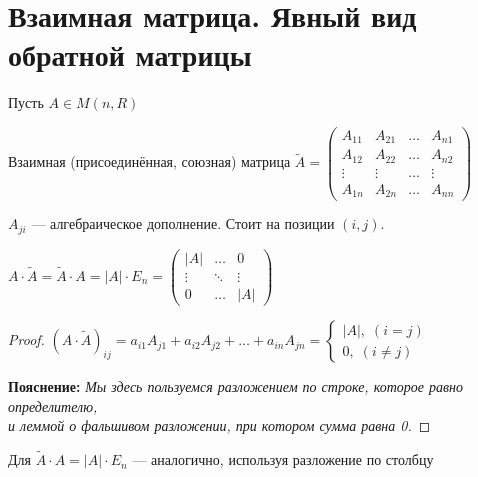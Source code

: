 
\section{Взаимная матрица. Явный вид обратной матрицы}

\begin{conj}
    
    Пусть $A \in M(n, R)$

    Взаимная (присоединённая, союзная) матрица $\widetilde{A} =
        \begin{pmatrix}
            A_{11} & A_{21} & \dots & A_{n1} \\
            A_{12} & A_{22} & \dots & A_{n2} \\
            \vdots & \vdots & \dots & \vdots \\
            A_{1n} & A_{2n} & \dots & A_{nn}
        \end{pmatrix}
    $

     \par
    
    $A_{ji}$ --- алгебраическое дополнение. Стоит на позиции $(i, j)$.
\end{conj}

\begin{theorem-non}
    
    $A \cdot \widetilde{A} = \widetilde{A} \cdot A = |A| \cdot E_n =
        \begin{pmatrix}
            |A| & \dots & 0 \\
            \vdots & \ddots & \vdots \\
            0 & \dots & |A|
        \end{pmatrix}
    $


    \begin{proof}
        $(A \cdot \widetilde{A})_{ij} = a_{i1}A_{j1} + a_{i2}A_{j2} + \dots + a_{in}A_{jn} =
            \begin{cases}
                |A|, \; (i = j) \\
                0, \; (i \neq j)
            \end{cases}
        $

        \textbf{Пояснение:}
        \emph{Мы здесь пользуемся разложением по строке,
        которое равно определителю,}\\
        \emph{и леммой о фальшивом разложении, при котором сумма равна 0.}
    \end{proof}

    \notice Для $\widetilde{A} \cdot A = |A| \cdot E_n$ --- аналогично,
    используя разложение по столбцу

\end{theorem-non}

